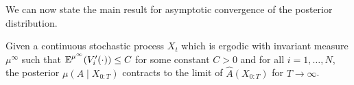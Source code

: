 \documentclass[10pt]{article}
\begin{document}
We can now state the main result for asymptotic convergence of the posterior distribution.
\begin{proposition}\label{prop:equiv} Given a continuous stochastic process $X_t$ which is ergodic with invariant measure $\mu^{\infty}$ such that $\operatorname{\mathbb{E}}^{\mu^\infty}(V_i'(\cdot)) \leq C$ for some constant $C > 0$ and for all $i = 1, \ldots, N$, the posterior $\mu(A \mid X_{0:T})$ contracts to the limit of $\widehat A(X_{0:T})$ for $T \to \infty$.
\end{proposition}
\end{document}
